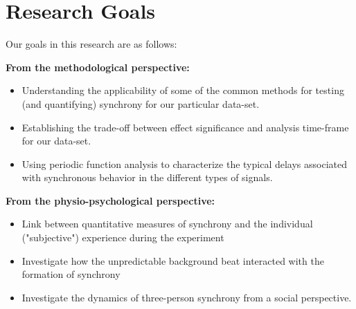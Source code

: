 \documentclass[a4paper, 11pt]{article}      %
\begin{document}
\section{Research Goals}
Our goals in this research are as follows: 

\textbf{From the methodological perspective:}
\begin{itemize}
\item Understanding the applicability of some of the common methods for testing (and quantifying) synchrony for our particular data-set.
\item Establishing the trade-off between effect significance and analysis time-frame for our data-set.
\item Using periodic function analysis to characterize the typical delays associated with synchronous behavior in the different types of signals.   
\end{itemize}

\textbf{From the physio-psychological perspective:}
\begin{itemize}
\item Link between quantitative measures of synchrony and the individual ("subjective") experience during the experiment
\item Investigate how the unpredictable background beat interacted with the formation of synchrony
\item Investigate the dynamics of three-person synchrony from a social perspective.
\end{itemize}
\end{document}
